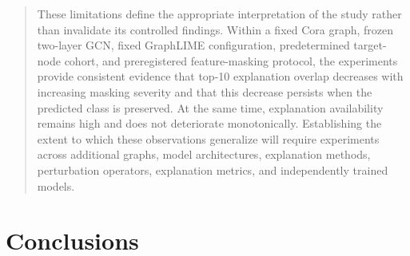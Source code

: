 \documentclass[a4paper]{article}
\begin{document}
\begin{quote}
These limitations define the appropriate interpretation of the study
rather than invalidate its controlled findings. Within a fixed Cora
graph, frozen two-layer GCN, fixed GraphLIME configuration,
predetermined target-node cohort, and preregistered feature-masking
protocol, the experiments provide consistent evidence that top-10
explanation overlap decreases with increasing masking severity and that
this decrease persists when the predicted class is preserved. At the
same time, explanation availability remains high and does not
deteriorate monotonically. Establishing the extent to which these
observations generalize will require experiments across additional
graphs, model architectures, explanation methods, perturbation
operators, explanation metrics, and independently trained models.
\end{quote}

\section{Conclusions}\label{conclusions}
\end{document}
